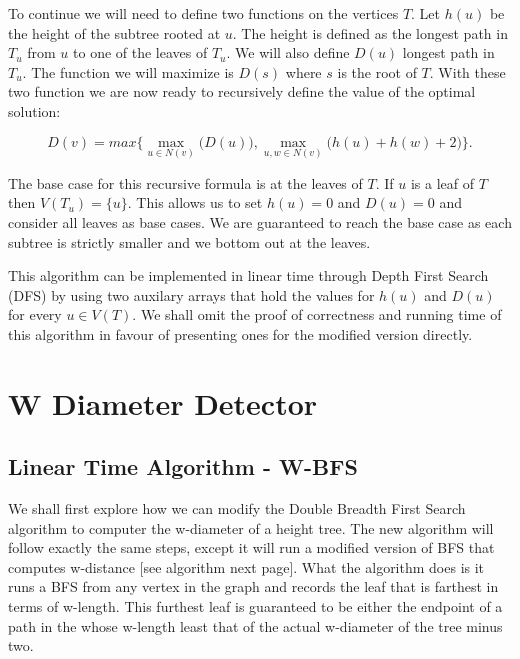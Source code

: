 To continue we will need to define two functions on the vertices $T$. Let $h(u)$ be the height of the subtree rooted at $u$. The height is defined as the longest path in $T_u$ from $u$ to one of the leaves of $T_u$. We will also define $D(u)$ longest path in $T_u$. The function we will maximize is $D(s)$ where $s$ is the root of $T$. With these two function we are now ready to recursively define the value of the optimal solution:

$$ D(v) = max\bigg\{ \max\limits_{u \in N(v)}\bigg(D(u)\bigg), \max\limits_{u, w \in N(v)}\bigg(h(u) + h(w) + 2\bigg) \bigg\}. $$

The base case for this recursive formula is at the leaves of $T$. If $u$ is a leaf of $T$ then $V(T_u) = \{u\}$. This allows us to set $h(u) = 0$ and $D(u) = 0$ and consider all leaves as base cases. We are guaranteed to reach the base case as each subtree is strictly smaller and we bottom out at the leaves.

This algorithm can be implemented in linear time through Depth First Search (DFS) by using two auxilary arrays that hold the values for $h(u)$ and $D(u)$ for every $u \in V(T)$. We shall omit the proof of correctness and running time of this algorithm in favour of presenting ones for the modified version directly.


\section{W Diameter Detector}


\subsection{Linear Time Algorithm - W-BFS}

We shall first explore how we can modify the Double Breadth First Search algorithm to computer the w-diameter of a height tree. The new algorithm will follow exactly the same steps, except it will run a modified version of BFS that computes w-distance [see algorithm next page]. What the algorithm does is it runs a BFS from any vertex in the graph and records the leaf that is farthest in terms of w-length. This furthest leaf is guaranteed to be either the endpoint of a path in the whose w-length least that of the actual w-diameter of the tree minus two. 


